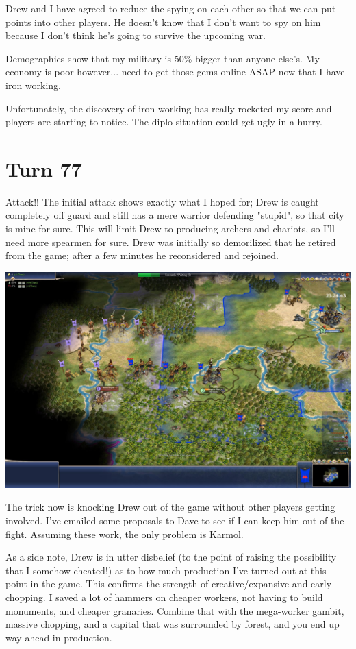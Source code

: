 \documentclass[10pt]{article}
\begin{document}
Drew and I have agreed to reduce the spying on each other so that we
can put points into other players. He doesn't know that I don't want
to spy on him because I don't think he's going to survive the upcoming
war.

Demographics show that my military is 50\% bigger than anyone
else's. My economy is poor however... need to get those gems online
ASAP now that I have iron working.

Unfortunately, the discovery of iron working has really rocketed my
score and players are starting to notice. The diplo situation could
get ugly in a hurry.

\section*{Turn 77}

Attack!! The initial attack shows exactly what I hoped for; Drew is
caught completely off guard and still has a mere warrior defending
"stupid", so that city is mine for sure. This will limit Drew to
producing archers and chariots, so I'll need more spearmen for
sure. Drew was initially so demorilized that he retired from the game;
after a few minutes he reconsidered and rejoined.

\includegraphics[width=1.0\textwidth]{turn77}

The trick now is knocking Drew out of the game without other players
getting involved. I've emailed some proposals to Dave to see if I can
keep him out of the fight. Assuming these work, the only problem is
Karmol.

As a side note, Drew is in utter disbelief (to the point of raising
the possibility that I somehow cheated!) as to how much production
I've turned out at this point in the game. This confirms the strength
of creative/expansive and early chopping. I saved a lot of hammers on
cheaper workers, not having to build monuments, and cheaper
granaries. Combine that with the mega-worker gambit, massive chopping,
and a capital that was surrounded by forest, and you end up way ahead
in production.
\end{document}
